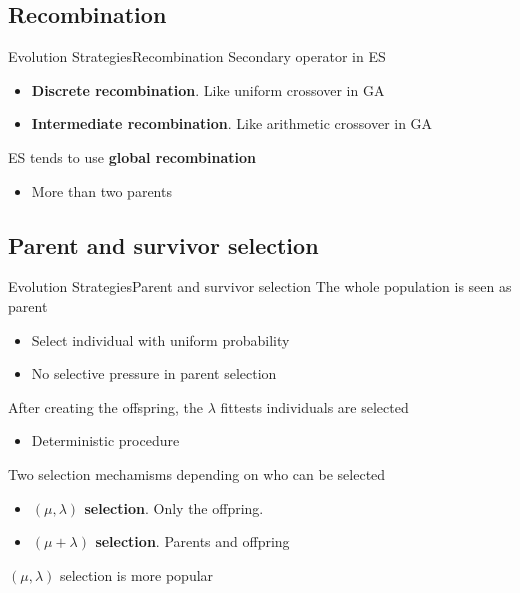 \documentclass[10pt,compress]{beamer} %
\begin{document}
\subsection{Recombination}
\begin{frame}{Evolution Strategies}{Recombination}
	Secondary operator in ES
	\begin{itemize}
		\item \textbf{Discrete recombination}. Like uniform crossover in GA
		\item \textbf{Intermediate recombination}. Like arithmetic crossover in GA
	\end{itemize}
	ES tends to use \textbf{global recombination}
	\begin{itemize}
		\item More than two parents
	\end{itemize}
\end{frame}

\subsection{Parent and survivor selection}
\begin{frame}{Evolution Strategies}{Parent and survivor selection}
	The whole population is seen as parent
	\begin{itemize}
		\item Select individual with uniform probability
		\item No selective pressure in parent selection
	\end{itemize}
	After creating the offspring, the $\lambda$ fittests individuals are selected
	\begin{itemize}
		\item Deterministic procedure
	\end{itemize}
	Two selection mechamisms depending on who can be selected
	\begin{itemize}
		\item \textbf{$(\mu, \lambda)$ selection}. Only the offpring.  
		\item \textbf{$(\mu + \lambda)$ selection}. Parents and offpring
	\end{itemize}
	$(\mu, \lambda)$ selection is more popular
\end{frame}
\end{document}
